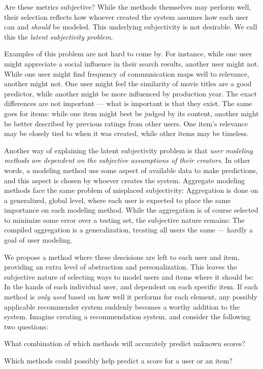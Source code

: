 Are these metrics subjective? 
While the methods themselves may perform well, their selection
reflects how whoever created the system assumes how each user
can and \emph{should} be modeled. This underlying subjectivity is not desirable.
We call this the \emph{latent subjectivity problem}.

Examples of this problem are not hard to come by.
For instance, while one user might appreciate a social
influence in their search results, another user might not.
While one user might find frequency of communication maps well to relevance,
another might not. 
One user might feel the similarity of movie titles are a good predictor,
while another might be more influenced by production year.
The exact differences are not important --- what is important is that they exist.
The same goes for items: while one item might best be judged by its content,
another might be better described by previous ratings from other users.
One item's relevance may be closely tied to when it was created,
while other items may be timeless.

Another way of explaining the latent subjectivity problem is that 
\emph{user modeling methods are dependent on the subjective assumptions of their creators}.
In other words, a modeling method use some aspect of available data to make predictions,
and this aspect is chosen by whoever creates the system.
Aggregate modeling methods face the same problem of misplaced subjectivity: 
Aggregation is done on a generalized, global level,
where each user is expected to place the same importance on each modeling method.
While the aggregation is of course selected to minimize some error over a testing set,
the subjective nature remains: The compiled aggregation is a generalization,
treating all users the same --- hardly a goal of user modeling.

We propose a method where these descisions are left to each user and item,
providing an extra level of abstraction and personalization.
This leaves the subjective nature of selecting ways to model users and items where it should be:
In the hands of each individual user, and dependent on each specific item.
If each method is \emph{only used} based on how well it performs for each element,
any possibly applicable recommender system suddenly becomes a worthy addition to the system.
Imagine creating a recommendation system, and consider the following two questions:

\begin{enumerate*}
  \item What combination of which methods will accurately predict unknown scores?
  \item Which methods could possibly help predict a score for a user or an item?
\end{enumerate*}

